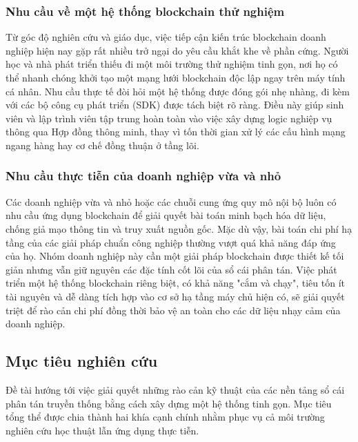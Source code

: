\documentclass[12pt,a4paper]{article}
\begin{document}
\subsubsection{Nhu cầu về một hệ thống blockchain thử nghiệm}
Từ góc độ nghiên cứu và giáo dục, việc tiếp cận kiến trúc blockchain doanh nghiệp hiện nay gặp rất nhiều trở ngại do yêu cầu khắt khe về phần cứng. Người học và nhà phát triển thiếu đi một môi trường thử nghiệm tinh gọn, nơi họ có thể nhanh chóng khởi tạo một mạng lưới blockchain độc lập ngay trên máy tính cá nhân. Nhu cầu thực tế đòi hỏi một hệ thống được đóng gói nhẹ nhàng, đi kèm với các bộ công cụ phát triển (SDK) được tách biệt rõ ràng. Điều này giúp sinh viên và lập trình viên tập trung hoàn toàn vào việc xây dựng logic nghiệp vụ thông qua Hợp đồng thông minh, thay vì tốn thời gian xử lý các cấu hình mạng ngang hàng hay cơ chế đồng thuận ở tầng lõi.

\subsubsection{Nhu cầu thực tiễn của doanh nghiệp vừa và nhỏ}
Các doanh nghiệp vừa và nhỏ hoặc các chuỗi cung ứng quy mô nội bộ luôn có nhu cầu ứng dụng blockchain để giải quyết bài toán minh bạch hóa dữ liệu, chống giả mạo thông tin và truy xuất nguồn gốc. Mặc dù vậy, bài toán chi phí hạ tầng của các giải pháp chuẩn công nghiệp thường vượt quá khả năng đáp ứng của họ. Nhóm doanh nghiệp này cần một giải pháp blockchain được thiết kế tối giản nhưng vẫn giữ nguyên các đặc tính cốt lõi của sổ cái phân tán. Việc phát triển một hệ thống blockchain riêng biệt, có khả năng "cắm và chạy", tiêu tốn ít tài nguyên và dễ dàng tích hợp vào cơ sở hạ tầng máy chủ hiện có, sẽ giải quyết triệt để rào cản chi phí đồng thời bảo vệ an toàn cho các dữ liệu nhạy cảm của doanh nghiệp.

\subsection{Mục tiêu nghiên cứu}
Đề tài hướng tới việc giải quyết những rào cản kỹ thuật của các nền tảng sổ cái phân tán truyền thống bằng cách xây dựng một hệ thống tinh gọn. Mục tiêu tổng thể được chia thành hai khía cạnh chính nhằm phục vụ cả môi trường nghiên cứu học thuật lẫn ứng dụng thực tiễn.
\end{document}
